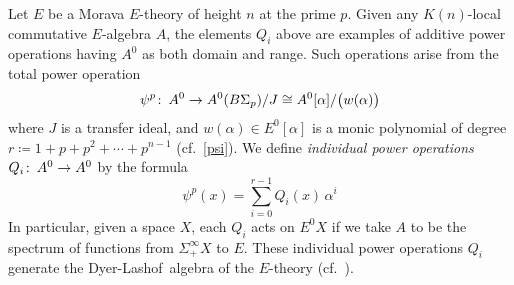 \documentclass{gtpart}
\theoremstyle{definition}
\theoremstyle{remark}
\def\co{\colon\thinspace}
\newcommand{\DL}{Dyer-Lashof~}
\newcommand{\A}{\alpha}
\newcommand{\ce}{\coloneqq}
\renewcommand{\=}{\approx}
\renewcommand{\-}{\sim}
\numberwithin{equation}{section}
\numberwithin{thm}{section}
\begin{document}
Let $E$ be a Morava $E$-theory of height $n$ at the prime $p$.  Given any 
$K(n)$-local commutative $E$-algebra $A$, the elements $Q_i$ above are examples 
of additive power operations having $A^0$ as both domain and range.  Such 
operations arise from the total power operation 
\begin{equation}
 \label{totalpo}
 \psi^p \co A^0 \to A^0(B\Sigma_p) / J \cong A^0[\A] / \big( w(\A) \big) 
\end{equation}
where $J$ is a transfer ideal, and $w(\A) \in E^0[\A]$ is a monic polynomial of 
degree $r \ce 1 + p + p^2 + \cdots + p^{n - 1}$ (cf.~\eqref{psi}).  We define 
{\em individual power operations} $Q_i \co A^0 \to A^0$ by the formula 
\begin{equation}
 \label{Q}
 \psi^p(x) = \sum_{i = 0}^{r - 1} Q_i(x) \, \A^i 
\end{equation}
In particular, given a space $X$, each $Q_i$ acts on $E^0 X$ if we take $A$ to 
be the spectrum of functions from $\Sigma_+^\infty X$ to $E$.  These individual 
power operations $Q_i$ generate the \DL algebra of the $E$-theory 
(cf.~\cite[proof of Theorem 3.10]{p3}).  
\end{document}
